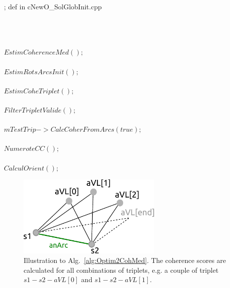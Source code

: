 \begin{algorithm}
\caption{; def in cNewO\_SolGlobInit.cpp  }
\begin{algorithmic}
\State 
\\
\Comment {}
\\
\\
\Comment {}
\State $EstimCoherenceMed();$
\\
\\
\Comment {}
\State $EstimRotsArcsInit();$
\\
\\
\Comment {}
\State $EstimCoheTriplet();$
\\
\\
\Comment {}
\State $FilterTripletValide();$
\\
\\
\Comment {}
\State $mTestTrip->CalcCoherFromArcs(true);$
\\
\\
\Comment {}
\State $NumeroteCC();$
\\
\\
\Comment {}
\State $CalculOrient();$
\\ 

\end{algorithmic}\label{alg:Optim2}
\end{algorithm}


\begin{figure}
\centering
\includegraphics[width=7cm]{img/triplet-sel.pdf}\caption{Illustration to Alg.~\ref{alg:Optim2CohMed}. The coherence scores are calculated for all combinations of triplets, e.g. a couple of triplet $s1-s2-aVL[0]$ and $s1-s2-aVL[1]$.}\label{fig:optim2tripletCoh}
\end{figure}

